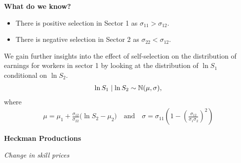 \begin{frame}
	\textbf{What do we know?}\medskip
	\begin{itemize}\setlength\itemsep{1em}
	\item There is positive selection in Sector 1 as $\sigma_{11} > \sigma_{12}$.
	\item There is negative selection in Sector 2 as $\sigma_{22} < \sigma_{12}$.
	\end{itemize}
\end{frame}
\begin{frame}
	We gain further insights into the effect of self-selection on the distribution of earnings for workers in sector 1 by looking at the  distribution of $\ln S_1$  conditional on $\ln S_2$.
	\begin{align*}
	\ln S_1 \mid \ln S_2 \sim \mathbb{N} (\mu, \sigma),
	\end{align*}
	where
	\begin{align*}
	\mu = \mu_1 + \frac{\sigma_{12}}{\sigma_{22}} \Bigg(\ln S_2 - \mu_2\Bigg) \quad\text{and}\quad
	\sigma = \sigma_{11} \left(1 - \left(\frac{\sigma_{12}}{\sigma_1 \sigma_2}\right)^2\right)
	\end{align*}
\end{frame}
\begin{frame}
	\begin{center}
		\LARGE\textbf{Heckman Productions}
	\end{center}
\end{frame}
{
	
}
\begin{frame}\begin{center}
	\LARGE\textit{Change in skill prices}
\end{center}\end{frame}
